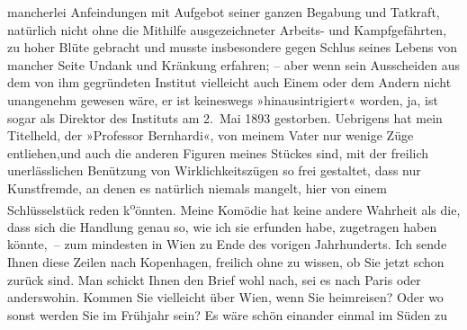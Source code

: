 \begin{ledgroupsized}[t]{13cm}
               mancherlei Anfeindungen mit Aufgebot seiner ganzen Begabung und Tatkraft, natürlich
               nicht ohne die Mithilfe ausgezeichneter Arbeits- und Kampfgefährten, zu hoher Blüte
               gebracht und musste insbesondere gegen Schlus seines Lebens von mancher Seite Undank
               und Kränkung erfahren; – aber wenn sein Ausscheiden aus dem von ihm gegründeten
               Institut vielleicht auch Einem oder dem Andern nicht unangenehm gewesen wäre, er ist
               keineswegs »hinausintrigiert« worden, ja,  ist
               sogar als Direktor des Instituts am
                  2. Mai 1893 gestorben. Uebrigens hat mein Titelheld, der »Professor Bernhardi«, von meinem
                  Vater nur wenige Züge
               entliehen,und auch die anderen Figuren meines Stückes sind, mit der freilich
               unerlässlichen Benützung von Wirklichkeitszügen so frei gestaltet, dass nur
               Kunstfremde, an denen es natürlich {\pb}niemals
               mangelt, hier von einem Schlüsselstück reden k\substVorne{}\textsuperscript{o}\substDazwischen{}ö\substHinten{}nnten. Meine Komödie hat
               keine andere Wahrheit als die, dass sich die Handlung genau so, wie ich sie
                  erfunden\strikeout{,} habe, zugetragen haben könnte, – zum
               mindesten in Wien zu Ende des vorigen
               Jahrhunderts.\pend
           \pstart
           Ich sende Ihnen diese Zeilen nach Kopenhagen,
               freilich ohne zu wissen, ob Sie jetzt schon zurück sind. Man schickt Ihnen den Brief
               wohl nach, sei es nach Paris oder anderswohin.
               Kommen Sie vielleicht über Wien, wenn Sie heimreisen?
               Oder wo sonst werden Sie im Frühjahr sein? Es wäre schön einander einmal im Süden zu

\end{ledgroupsized}
